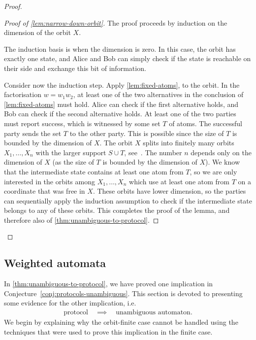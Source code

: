 \begin{proof}
\begin{proof}[Proof of \cref{lem:narrow-down-orbit}]
    The proof proceeds by induction on the dimension of the orbit $X$.
    
    The induction basis is when the  dimension is zero. In this case, the orbit has exactly one state, and Alice and Bob can simply check  if the state is reachable on their side and exchange this bit of information.

    Consider now the induction step. Apply \cref{lem:fixed-atoms}, to the orbit. In the factorisation $w = w_1 w_2$, at least one of the two alternatives in the conclusion of \cref{lem:fixed-atoms} must hold. Alice can check if the first alternative holds, and Bob can check if the second alternative holds.  At least one of the two parties must report success, which is witnessed by some set $T$ of atoms. The successful party sends the set $T$ to the other party. This is possible since the size of $T$ is bounded by the dimension of $X$. The orbit $X$ splits into finitely many orbits $X_1,\ldots,X_n$ with the larger support $S \cup T$, see~\cite[Lemma 10.9]{bojanczyk_slightly}. The number $n$ depends only on the dimension of $X$ (as the size of $T$ is bounded by the dimension of $X$).
    We know that the intermediate state contains at least one atom from $T$, so we are only interested in the orbits among $X_1,\ldots,X_n$ which use at least one atom from $T$ on a coordinate that was free in $X$. These orbits have lower dimension,
    so the parties can sequentially apply the induction assumption to check if the intermediate state belongs to any of these orbits.
    This completes the proof of the lemma, and therefore also of \cref{thm:unambiguous-to-protocol}.
\end{proof}
\end{proof}


\subsection{Weighted automata}
\label{sec:weighted-automata-atoms}

In \cref{thm:unambiguous-to-protocol}, we have proved one implication in Conjecture~\ref{conj:protocols-unambiguous}. This section is devoted to presenting some evidence for the other implication, i.e.
\begin{align}\label{eq:missing-orbit-finite-implication}
\text{protocol} \quad \implies \quad \text{unambiguous automaton}.
\end{align}
 We begin by explaining why the  orbit-finite case cannot be handled using the techniques that were used to prove this implication in the finite case.


